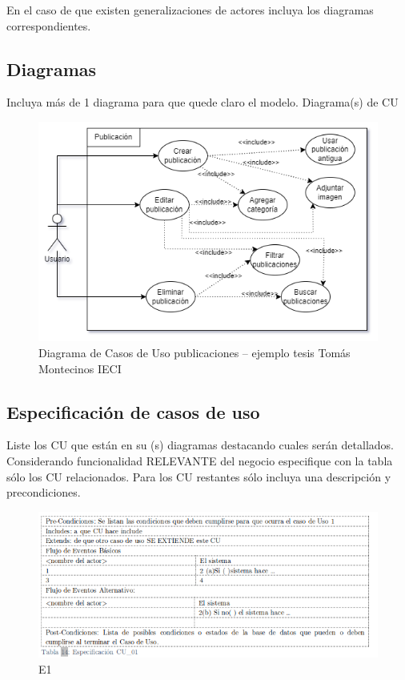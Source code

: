 En el caso de que existen generalizaciones de actores incluya los diagramas correspondientes.

\subsection{Diagramas}

Incluya más de 1 diagrama para que quede claro el modelo.
Diagrama(s) de CU


\begin{figure}[H]
    \centering
    \includegraphics[scale=0.5]{figures/i3.png}
    \caption{Diagrama de Casos de Uso publicaciones – ejemplo tesis Tomás Montecinos IECI}
    \label{fig:e3}
\end{figure}

\subsection{Especificación de casos de uso}

Liste los CU que están en su (s) diagramas destacando cuales serán detallados.
Considerando funcionalidad RELEVANTE del negocio especifique con la tabla sólo los CU relacionados. Para los CU restantes sólo incluya una descripción y precondiciones.


\begin{figure}[H]
    \centering
    \includegraphics[scale=0.5]{figures/i12.png}
    \caption{E1}
    \label{fig:i12}
\end{figure}

